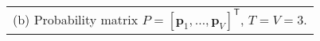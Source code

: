 \scriptsize
\begin{tabular}[t]{l}
	(b) Probability matrix $P = [\bm{p}_1, \ldots, \bm{p}_V]^\mathsf{T}$, $T=V=3$.
\end{tabular}